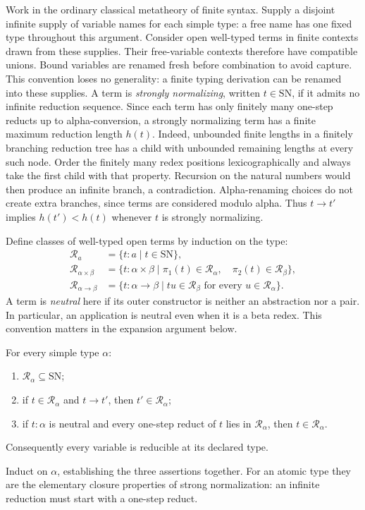 Work in the ordinary classical metatheory of finite syntax. Supply
a disjoint infinite supply of variable names for each simple type: a free
name has one fixed type throughout this argument. Consider open well-typed
terms in finite contexts drawn from these supplies. Their free-variable
contexts therefore have compatible unions. Bound variables are renamed
fresh before combination to avoid capture. This convention loses no
generality: a finite typing derivation can be renamed into these supplies.
A term is \emph{strongly normalizing}, written $t\in\mathrm{SN}$, if
it admits no infinite reduction sequence. Since each term has only
finitely many one-step reducts up to alpha-conversion, a strongly
normalizing term has a finite maximum reduction length $h(t)$.
Indeed, unbounded finite lengths in a finitely branching reduction tree
has a child with unbounded remaining lengths at every such node. Order
the finitely many redex positions lexicographically and always take the
first child with that property. Recursion on the natural numbers would
then produce an infinite branch, a contradiction. Alpha-renaming choices
do not create extra branches, since terms are considered modulo alpha. Thus $t\to t'$ implies
$h(t')<h(t)$ whenever $t$ is strongly normalizing.

\begin{definition}
Define classes of well-typed open terms by induction on the type:
\[
\begin{aligned}
\mathcal R_a&=\{t:a\mid t\in\mathrm{SN}\},\\
\mathcal R_{\alpha\times\beta}
 &=\{t:\alpha\times\beta\mid
       \pi_1(t)\in\mathcal R_\alpha,\quad
       \pi_2(t)\in\mathcal R_\beta\},\\
\mathcal R_{\alpha\to\beta}
 &=\{t:\alpha\to\beta\mid
       tu\in\mathcal R_\beta\text{ for every }u\in\mathcal R_\alpha\}.
\end{aligned}
\]
A term is \emph{neutral} here if its outer constructor is neither an
abstraction nor a pair. In particular, an application is neutral even
when it is a beta redex. This convention matters in the expansion
argument below.
\end{definition}

\begin{lemma}
For every simple type $\alpha$:
\begin{enumerate}
\item $\mathcal R_\alpha\subseteq\mathrm{SN}$;
\item if $t\in\mathcal R_\alpha$ and $t\to t'$, then
      $t'\in\mathcal R_\alpha$;
\item if $t:\alpha$ is neutral and every one-step reduct of $t$ lies
      in $\mathcal R_\alpha$, then $t\in\mathcal R_\alpha$.
\end{enumerate}
Consequently every variable is reducible at its declared type.
\end{lemma}
\Proof
Induct on $\alpha$, establishing the three assertions together. For an
atomic type they are the elementary closure properties of strong
normalization: an infinite reduction must start with a one-step reduct.

